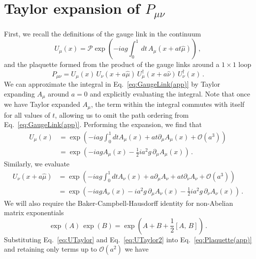 \section{Taylor expansion of $P_{\mu\nu}$}\label{app:TEPlaquette}
First, we recall the definitions of the gauge link in the continuum
%
\begin{equation}
U_\mu(x) = \mathcal{P}\exp\left(-iag\int_0^1 \,dt \,A_\mu(x + at\hat{\mu})\right)  \, ,
\label{eq:GaugeLink(app)}
\end{equation}
%
and the plaquette formed from the product of the gauge links around a $1\times 1$ loop
\begin{equation}
P_{\mu\nu} = U_\mu(x)\,U_\nu(x+a\hat{\mu})\,U^\dagger_\mu(x+a\hat{\nu})\,U^\dagger_\nu(x)\, .
\label{eq:Plaquette(app)}
\end{equation}
%
We can approximate the integral in Eq.~\eqref{eq:GaugeLink(app)} by Taylor expanding $A_\mu$ around $a=0$ and explicitly evaluating the integral. Note that once we have Taylor expanded $A_\mu$, the term within the integral commutes with itself for all values of $t$, allowing us to omit the path ordering from Eq.~\eqref{eq:GaugeLink(app)}. Performing the expansion, we find that
%
\begin{align}
U_\mu(x)&=\exp\left(-iag\int_0^1 dt A_\mu\left(x\right) + at\partial_\mu A_\mu(x) + \mathcal{O}(a^3)\right)\nonumber\\
&=\exp\left(-iag A_\mu\left(x\right) - \frac{1}{2}ia^2 g\, \partial_\mu A_\mu\left(x\right)\right)\, . \label{eq:UTaylor}
\end{align}
%
Similarly, we evaluate
%
\begin{align}
U_\nu(x+a\hat{\mu}) &= \exp\left(-iag\int_0^1 dt A_\nu(x) + a\partial_\mu A_\nu + at\partial_\nu A_\nu + \mathcal{O}(a^3)\right)\nonumber\\
&= \exp\left(-iag A_\nu(x) - ia^2g\,\partial_\mu A_\nu(x) - \frac{1}{2}ia^2 g\,\partial_\nu A_\nu(x)\right)\, . \label{eq:UTaylor2}
\end{align}
%
We will also require the Baker-Campbell-Hausdorff identity for non-Abelian matrix exponentials
%
\begin{equation}
\exp(A)\,\exp(B) = \exp\left(A + B +\frac{1}{2}[A,\,B]\right)\, .
\label{eq:BCH}
\end{equation}
%
Substituting Eq.~\eqref{eq:UTaylor} and Eq.~\eqref{eq:UTaylor2} into Eq.~\eqref{eq:Plaquette(app)} and retaining only terms up to $\mathcal{O}(a^2)$ we have
%
